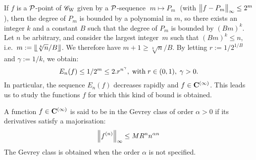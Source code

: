 \smallskip{} 

\noindent 
If $f$ is a ${\cal P}$-point of ${{{\mathscr C}}_{\rm W}}$ given by a ${\cal P}$-sequence $\; m \mapsto P_m\; $
 (with $\big\lVert  f - P_m \big\rVert_{\infty} \leq 2^m$), then the degree of $P_m$ is bounded by a polynomial in $m$, so there exists an integer $ k$ and a constant $ B$ such that the degree of $ P_m$ is bounded by $(Bm)^k$. 
Let $ n $ be arbitrary, and consider the largest integer~$ m $ such that $(Bm)^k \leq n$, i.e.\ $m:= \llfloor \sqrt[k]{n}/B \rrfloor$. 
We therefore have $m+1 \geq \sqrt[k]{n}/B$. By letting $r := 1/2^{1/B}$
 and $\gamma := 1/k$, we obtain: 
\[
E_n(f) \leq 1/2^m \leq 2.r^{n^{\gamma}}, \; {\rm with} \; r \in  (0,1) , \; 
\gamma > 0.
\]
In particular, the sequence $E_n(f)$ decreases rapidly and $f\in{\bf C}^{(\infty)}$.
This leads us to study the functions $f$ for which this kind of bound is obtained.

\begin{definition} \label{522}

\noindent 
A function $f\in {\bf C}^{(\infty)}$ is said to be in the Gevrey class of order $\alpha > 0 $ if its derivatives satisfy a majorisation: 
\[
\Big\lVert f^{(n)}  \Big\rVert_{\infty}\leq  MR^n n^{\alpha n}
\]
The Gevrey class is obtained when the order $\alpha$ is not specified. 
\end{definition}

